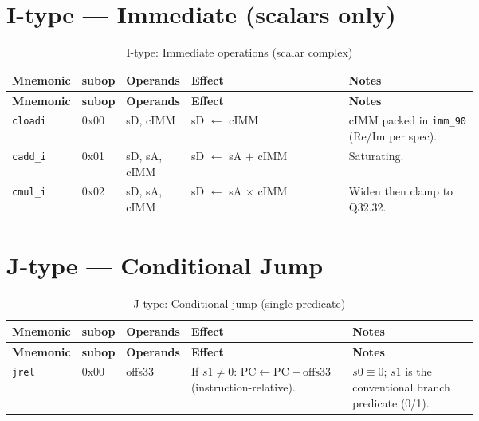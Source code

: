 \documentclass[10pt]{article}
\begin{document}
\section*{I-type — Immediate (scalars only)}
\begin{longtable}{@{}l l l L{0.38\linewidth} L{0.30\linewidth}@{}}
\caption{I-type: Immediate operations (scalar complex)}\label{tab:itype}\\
\toprule
\textbf{Mnemonic} & \textbf{subop} & \textbf{Operands} & \textbf{Effect} & \textbf{Notes} \\
\midrule
\endfirsthead
\toprule
\textbf{Mnemonic} & \textbf{subop} & \textbf{Operands} & \textbf{Effect} & \textbf{Notes} \\
\midrule
\endhead
\texttt{cloadi}  & 0x00 & sD, cIMM     & sD $\leftarrow$ cIMM & cIMM packed in \texttt{imm\_90} (Re/Im per spec). \\
\texttt{cadd\_i} & 0x01 & sD, sA, cIMM & sD $\leftarrow$ sA $+$ cIMM & Saturating. \\
\texttt{cmul\_i} & 0x02 & sD, sA, cIMM & sD $\leftarrow$ sA $\times$ cIMM & Widen then clamp to Q32.32. \\
\bottomrule
\end{longtable}

\section*{J-type — Conditional Jump}
\begin{longtable}{@{}l l l L{0.38\linewidth} L{0.30\linewidth}@{}}
\caption{J-type: Conditional jump (single predicate)}\label{tab:jtype}\\
\toprule
\textbf{Mnemonic} & \textbf{subop} & \textbf{Operands} & \textbf{Effect} & \textbf{Notes} \\
\midrule
\endfirsthead
\toprule
\textbf{Mnemonic} & \textbf{subop} & \textbf{Operands} & \textbf{Effect} & \textbf{Notes} \\
\midrule
\endhead
\texttt{jrel} & 0x00 & offs33 &
If $s1 \neq 0$: $\mathrm{PC} \leftarrow \mathrm{PC} + \text{offs33}$ (instruction-relative). &
$s0 \equiv 0$; $s1$ is the conventional branch predicate (0/1). \\
\bottomrule
\end{longtable}

\end{document}
